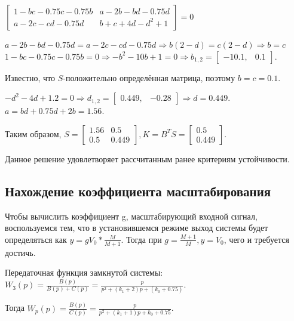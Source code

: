 \documentclass[14pt,a4paper,report]{report}
\begin{document}
\begin{center}
	$\begin{bmatrix} 1-bc-0.75c-0.75b & a-2b-bd-0.75d \\ a-2c-cd-0.75d & b+c+4d-d^2+1 \end{bmatrix}=0$
\end{center}

\begin{center}
	$a-2b-bd-0.75d=a-2c-cd-0.75d \Longrightarrow b(2-d)=c(2-d) \Longrightarrow b=c$\\
	$1-bc-0.75c-0.75b=0 \Longrightarrow -b^2-10b+1=0 \Longrightarrow b_{1,2}=\begin{bmatrix} -10.1, & 0.1 \end{bmatrix}$.
\end{center}

Известно, что $S$-положительно определённая матрица, поэтому $b=c=0.1$.

\begin{center}
	$-d^2-4d+1.2=0 \Longrightarrow d_{1,2}=\begin{bmatrix} 0.449, & -0.28 \end{bmatrix} \Longrightarrow d=0.449$.\\
	$a=bd+0.75d+2b=1.56$.
\end{center}

Таким образом, $S=\begin{bmatrix} 1.56 & 0.5 \\ 0.5 & 0.449 \end{bmatrix}, K=B^TS=\begin{bmatrix} 0.5 \\ 0.449 \end{bmatrix}$.

Данное решение удовлетворяет рассчитанным ранее критериям устойчивости.

\subsection{Нахождение коэффициента масштабирования}

Чтобы вычислить коэффициент g, масштабирующий входной сигнал, воспользуемся тем, что в установившемся режиме выход системы будет определяться как $y=gV_0*\frac{M}{M+1}$. Тогда при $g=\frac{M+1}{M}, y=V_0$, чего и требуется достичь.

Передаточная функция замкнутой системы: $W_3(p)=\frac{B(p)}{B(p)+C(p)}=\frac{p}{p^2+(k_1+2)p+(k_0+0.75)}$.

Тогда $W_p(p)=\frac{B(p)}{C(p)}=\frac{p}{p^2+(k_1+1)p+k_0+0.75}$.
\end{document}
